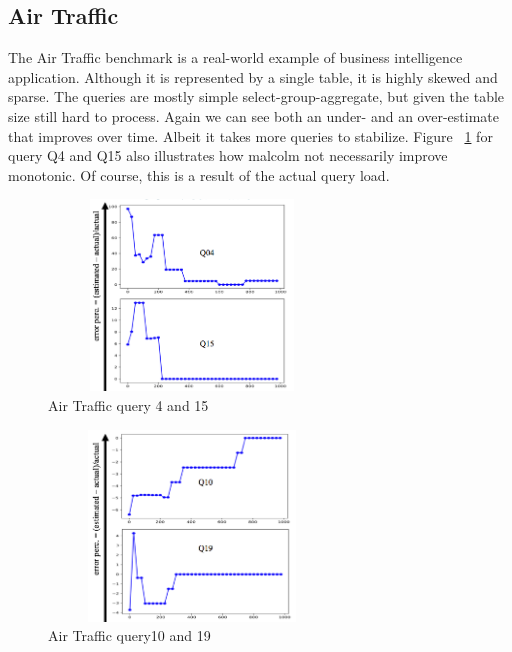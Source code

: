 \documentclass[conference]{IEEEtran}
\begin{document}
\subsection{Air Traffic}
The Air Traffic benchmark is a real-world example of  business intelligence application.
Although it is represented by a single table, it is highly skewed and sparse.
The queries are mostly simple select-group-aggregate, but given the table size still hard to process.
Again we can see both an under- and an over-estimate that improves over time. Albeit it takes more queries to stabilize.
Figure ~\ref{fig:airtraffic-q4-q15} for query Q4 and Q15 also illustrates how {\sc malcolm} not necessarily improve monotonic.
Of course, this is a result of the actual query load.

\begin{figure}[t!]
	\centering
	\includegraphics[height=2in,width=3in]{Figures/Q4-15.png}
	\caption{Air Traffic query 4 and 15
		\label{fig:airtraffic-q4-q15}}
\end{figure}

\begin{figure}[t!]
	\centering
	\includegraphics[height=2in,width=3in]{Figures/Q10-19.png}
	\caption{Air Traffic query10 and 19
		\label{fig:airtraffic-q10-q19}}
\end{figure}
\end{document}
